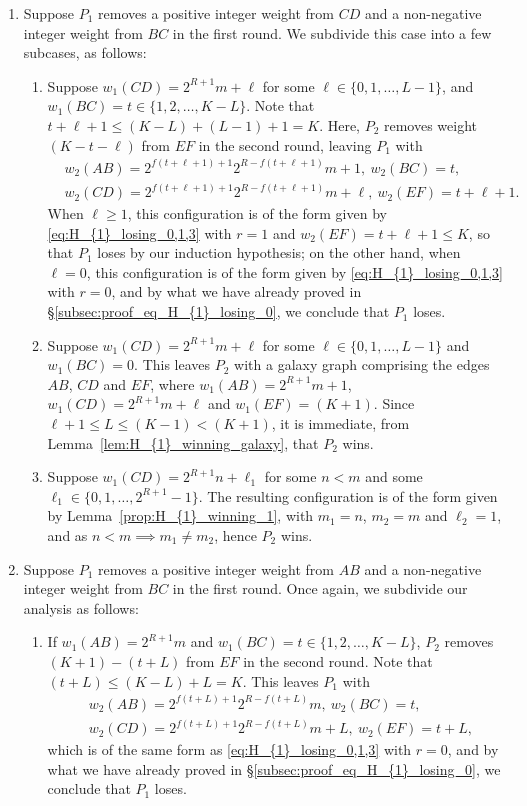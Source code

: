 \documentclass[11pt,reqno]{amsart}
\theoremstyle{definition}
\theoremstyle{definition}
\begin{document}
\begin{enumerate}
\item Suppose $P_{1}$ removes a positive integer weight from $CD$ and a non-negative integer weight from $BC$ in the first round. We subdivide this case into a few subcases, as follows:
\begin{enumerate}
\item Suppose $w_{1}(CD)=2^{R+1}m+\ell$ for some $\ell \in \{0,1,\ldots,L-1\}$, and $w_{1}(BC)=t \in \{1,2,\ldots,K-L\}$. Note that $t+\ell+1\leqslant(K-L)+(L-1)+1=K$. Here, $P_{2}$ removes weight $(K-t-\ell)$ from $EF$ in the second round, leaving $P_{1}$ with
\begin{align}
{}&w_{2}(AB)=2^{f(t+\ell+1)+1}2^{R-f(t+\ell+1)}m+1,\ w_{2}(BC)=t,\nonumber\\
{}&w_{2}(CD)=2^{f(t+\ell+1)+1}2^{R-f(t+\ell+1)}m+\ell,\ w_{2}(EF)=t+\ell+1.\nonumber
\end{align}
When $\ell\geqslant 1$, this configuration is of the form given by \eqref{eq:H_{1}_losing_0,1,3} with $r=1$ and $w_{2}(EF)=t+\ell+1\leqslant K$, so that $P_{1}$ loses by our induction hypothesis; on the other hand, when $\ell=0$, this configuration is of the form given by \eqref{eq:H_{1}_losing_0,1,3} with $r=0$, and by what we have already proved in \S\ref{subsec:proof_eq_H_{1}_losing_0}, we conclude that $P_{1}$ loses.

\item Suppose $w_{1}(CD)=2^{R+1}m+\ell$ for some $\ell \in \{0,1,\ldots,L-1\}$ and $w_{1}(BC)=0$. This leaves $P_{2}$ with a galaxy graph comprising the edges $AB$, $CD$ and $EF$, where $w_{1}(AB)=2^{R+1}m+1$, $w_{1}(CD)=2^{R+1}m+\ell$ and $w_{1}(EF)=(K+1)$. Since $\ell+1\leqslant L\leqslant(K-1)<(K+1)$, it is immediate, from Lemma~\ref{lem:H_{1}_winning_galaxy}, that $P_{2}$ wins.

\item Suppose $w_{1}(CD)=2^{R+1}n+\ell_{1}$ for some $n < m$ and some $\ell_{1} \in \{0,1,\ldots,2^{R+1}-1\}$. The resulting configuration is of the form given by Lemma~\ref{prop:H_{1}_winning_1}, with $m_{1}=n$, $m_{2}=m$ and $\ell_{2}=1$, and as $n<m \implies m_{1}\neq m_{2}$, hence $P_{2}$ wins.
\end{enumerate}

\item Suppose $P_{1}$ removes a positive integer weight from $AB$ and a non-negative integer weight from $BC$ in the first round. Once again, we subdivide our analysis as follows:
\begin{enumerate}
\item If $w_{1}(AB)=2^{R+1}m$ and $w_{1}(BC)=t\in \{1,2,\ldots,K-L\}$, $P_{2}$ removes $(K+1)-(t+L)$ from $EF$ in the second round. Note that $(t+L)\leqslant(K-L)+L=K$. This leaves $P_{1}$ with 
\begin{align}
{}&w_{2}(AB)=2^{f(t+L)+1}2^{R-f(t+L)}m,\ w_{2}(BC)=t,\nonumber\\
{}&w_{2}(CD)=2^{f(t+L)+1}2^{R-f(t+L)}m+L,\ w_{2}(EF)=t+L,\nonumber
\end{align}
which is of the same form as \eqref{eq:H_{1}_losing_0,1,3} with $r=0$, and by what we have already proved in \S\ref{subsec:proof_eq_H_{1}_losing_0}, we conclude that $P_{1}$ loses.


\end{enumerate}
\end{enumerate}
\end{document}
